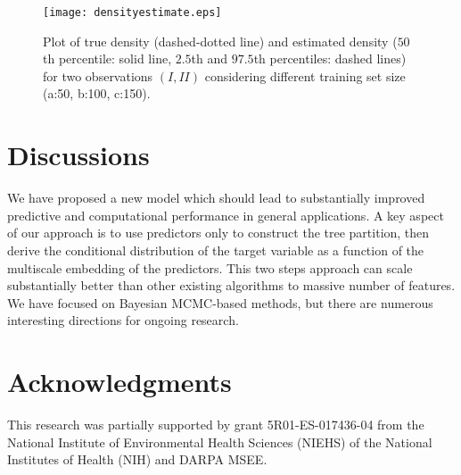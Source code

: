 \documentclass{article}
\begin{document}
\begin{figure}
\centering
\texttt{[image: densityestimate.eps]}
\caption{Plot of true density (dashed-dotted line) and estimated density ($50$th percentile: solid line, $2.5$th and $97.5$th percentiles: dashed lines) for two observations $(I, II)$ considering different training set size (a:50, b:100, c:150). } \label{plotDensity}
\end{figure}

\section*{Discussions}
We have proposed a new model which should lead to substantially improved predictive and computational performance in general applications. A key aspect of our approach is to use predictors only to construct the tree partition, then derive the conditional distribution of the target variable  as a function of the multiscale embedding of the predictors. This two steps approach can scale substantially better than other existing algorithms to massive number of features. We have focused on Bayesian MCMC-based methods, but there are numerous interesting directions for ongoing research.

\section*{Acknowledgments}
This research was partially supported by grant 5R01-ES-017436-04 from the National Institute of Environmental Health Sciences (NIEHS) of the National Institutes of Health (NIH) and DARPA MSEE.




\end{document}
